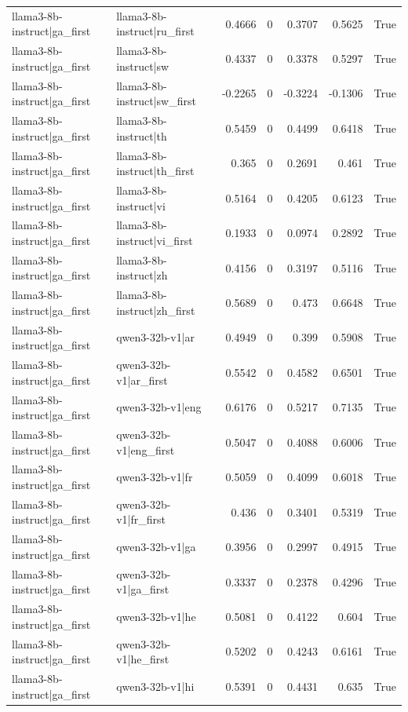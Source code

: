\begin{table}
\begin{tabular}{l l r r r r l}
llama3-8b-instruct|ga_first & llama3-8b-instruct|ru_first & 0.4666 & 0 & 0.3707 & 0.5625 & True \\
llama3-8b-instruct|ga_first & llama3-8b-instruct|sw & 0.4337 & 0 & 0.3378 & 0.5297 & True \\
llama3-8b-instruct|ga_first & llama3-8b-instruct|sw_first & -0.2265 & 0 & -0.3224 & -0.1306 & True \\
llama3-8b-instruct|ga_first & llama3-8b-instruct|th & 0.5459 & 0 & 0.4499 & 0.6418 & True \\
llama3-8b-instruct|ga_first & llama3-8b-instruct|th_first & 0.365 & 0 & 0.2691 & 0.461 & True \\
llama3-8b-instruct|ga_first & llama3-8b-instruct|vi & 0.5164 & 0 & 0.4205 & 0.6123 & True \\
llama3-8b-instruct|ga_first & llama3-8b-instruct|vi_first & 0.1933 & 0 & 0.0974 & 0.2892 & True \\
llama3-8b-instruct|ga_first & llama3-8b-instruct|zh & 0.4156 & 0 & 0.3197 & 0.5116 & True \\
llama3-8b-instruct|ga_first & llama3-8b-instruct|zh_first & 0.5689 & 0 & 0.473 & 0.6648 & True \\
llama3-8b-instruct|ga_first & qwen3-32b-v1|ar & 0.4949 & 0 & 0.399 & 0.5908 & True \\
llama3-8b-instruct|ga_first & qwen3-32b-v1|ar_first & 0.5542 & 0 & 0.4582 & 0.6501 & True \\
llama3-8b-instruct|ga_first & qwen3-32b-v1|eng & 0.6176 & 0 & 0.5217 & 0.7135 & True \\
llama3-8b-instruct|ga_first & qwen3-32b-v1|eng_first & 0.5047 & 0 & 0.4088 & 0.6006 & True \\
llama3-8b-instruct|ga_first & qwen3-32b-v1|fr & 0.5059 & 0 & 0.4099 & 0.6018 & True \\
llama3-8b-instruct|ga_first & qwen3-32b-v1|fr_first & 0.436 & 0 & 0.3401 & 0.5319 & True \\
llama3-8b-instruct|ga_first & qwen3-32b-v1|ga & 0.3956 & 0 & 0.2997 & 0.4915 & True \\
llama3-8b-instruct|ga_first & qwen3-32b-v1|ga_first & 0.3337 & 0 & 0.2378 & 0.4296 & True \\
llama3-8b-instruct|ga_first & qwen3-32b-v1|he & 0.5081 & 0 & 0.4122 & 0.604 & True \\
llama3-8b-instruct|ga_first & qwen3-32b-v1|he_first & 0.5202 & 0 & 0.4243 & 0.6161 & True \\
llama3-8b-instruct|ga_first & qwen3-32b-v1|hi & 0.5391 & 0 & 0.4431 & 0.635 & True \\

\end{tabular}
\end{table}
